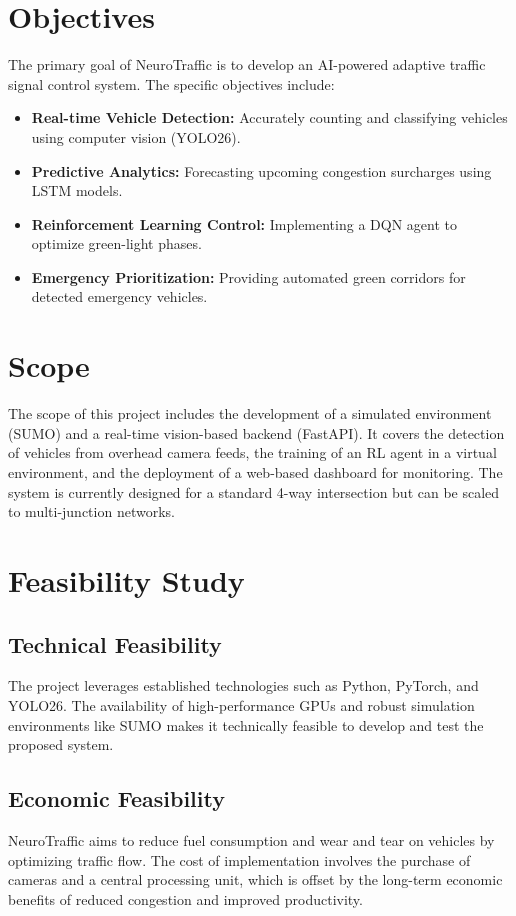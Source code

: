 \documentclass[12pt,a4paper]{report}
\begin{document}
\section{Objectives}
The primary goal of NeuroTraffic is to develop an AI-powered adaptive traffic signal control system. The specific objectives include:
\begin{itemize}
    \item \textbf{Real-time Vehicle Detection:} Accurately counting and classifying vehicles using computer vision (YOLO26).
    \item \textbf{Predictive Analytics:} Forecasting upcoming congestion surcharges using LSTM models.
    \item \textbf{Reinforcement Learning Control:} Implementing a DQN agent to optimize green-light phases.
    \item \textbf{Emergency Prioritization:} Providing automated green corridors for detected emergency vehicles.
\end{itemize}

\section{Scope}
The scope of this project includes the development of a simulated environment (SUMO) and a real-time vision-based backend (FastAPI). It covers the detection of vehicles from overhead camera feeds, the training of an RL agent in a virtual environment, and the deployment of a web-based dashboard for monitoring. The system is currently designed for a standard 4-way intersection but can be scaled to multi-junction networks.

\section{Feasibility Study}
\subsection{Technical Feasibility}
The project leverages established technologies such as Python, PyTorch, and YOLO26. The availability of high-performance GPUs and robust simulation environments like SUMO makes it technically feasible to develop and test the proposed system.

\subsection{Economic Feasibility}
NeuroTraffic aims to reduce fuel consumption and wear and tear on vehicles by optimizing traffic flow. The cost of implementation involves the purchase of cameras and a central processing unit, which is offset by the long-term economic benefits of reduced congestion and improved productivity.
\end{document}
